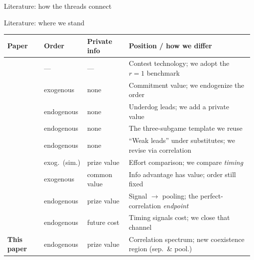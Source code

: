 \documentclass[10pt]{beamer}
\let\focusoldcitet\citet
\renewcommand{\citet}[1]{\textcolor{alert}{\focusoldcitet{#1}}}%
\begin{document}
\begin{frame}{Literature: how the threads connect}
\begin{center}
{}
  \end{center}
\end{frame}

\begin{frame}{Literature: where we stand}
  \scriptsize
  \setlength{\tabcolsep}{4pt}
  \renewcommand{\arraystretch}{1.15}
  \begin{tabular}{@{}l l l p{3.9cm}@{}}
    \toprule
    \textbf{Paper} & \textbf{Order} & \textbf{Private info} &
    \textbf{Position / how we differ} \\
    \midrule
    \citet{tullock1980}     & ---        & ---        &
      Contest technology; we adopt the $r{=}1$ benchmark \\
    \citet{dixit1987}       & exogenous  & none       &
      Commitment value; we endogenize the order \\
    \citet{baikshogren1992} & endogenous & none       &
      Underdog leads; we add a private value \\
    \citet{hamilton1990}    & endogenous & none       &
      The three-subgame template we reuse \\
    \citet{hoffmann2012}    & endogenous & none       &
      ``Weak leads'' under substitutes; we revise via correlation \\
    \citet{hurley1998}      & exog.\ (sim.) & prize value &
      Effort comparison; we compare \emph{timing} \\
    \citet{warneryd2003}    & exogenous  & common value &
      Info advantage has value; order still fixed \\
    \citet{fu2006}          & endogenous & prize value &
      Signal $\to$ pooling; the perfect-correlation \emph{endpoint} \\
    \citet{protopappas2025} & endogenous & future cost &
      Timing signals cost; we close that channel \\
    \midrule
    \textbf{This paper}     & endogenous & prize value &
      Correlation spectrum; new coexistence region (sep.\ \& pool.) \\
    \bottomrule
  \end{tabular}
\end{frame}
\end{document}
